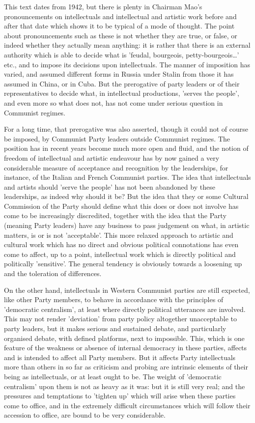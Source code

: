 This text dates from 1942, but there is plenty in Chairman Mao's pronouncements on intellectuals and intellectual and artistic work before and after that date which shows it to be typical of a mode of thought. The point about pronouncements such as these is not whether they are true, or false, or indeed whether they actually mean anything: it is rather that there is an external authority which is able to decide what is 'feudal, bourgeois, petty-bourgeois\dots{}' etc., and to impose its decisions upon intellectuals. The manner of imposition has varied, and assumed different forms in Russia under Stalin from those it has assumed in China, or in Cuba. But the prerogative of party leaders or of their representatives to decide what, in intellectual productions, 'serves the people', and even more so what does not, has not come under serious question in Communist regimes.

For a long time, that prerogative was also asserted, though it could not of course be imposed, by Communist Party leaders outside Communist regimes. The position has in recent years become much more open and fluid, and the notion of freedom of intellectual and artistic endeavour has by now gained a very considerable measure of acceptance and recognition by the leaderships, for instance, of the Italian and French Communist parties. The idea that intellectuals and artists should 'serve the people' has not been abandoned by these leaderships, as indeed why should it be? But the idea that they or some Cultural Commission of the Party should define what this does or does not involve has come to be increasingly discredited, together with the idea that the Party (meaning Party leaders) have any business to pass judgement on what, in artistic matters, is or is not 'acceptable'. This more relaxed approach to artistic and cultural work which has no direct and obvious political connotations has even come to affect, up to a point, intellectual work which is directly political and politically 'sensitive'. The general tendency is obviously towards a loosening up and the toleration of differences.

On the other hand, intellectuals in Western Communist parties are still expected, like other Party members, to behave in accordance with the principles of 'democratic centralism', at least where directly political utterances are involved. This may not render 'deviation' from party policy altogether unacceptable to party leaders, but it makes serious and sustained debate, and particularly organised debate, with defined platforms, next to impossible. This, which is one feature of the weakness or absence of internal democracy in these parties, affects and is intended to affect all Party members. But it affects Party intellectuals more than others in so far as criticism and probing are intrinsic elements of their being as intellectuals, or at least ought to be. The weight of 'democratic centralism' upon them is not as heavy as it was: but it is still very real; and the pressures and temptations to 'tighten up' which will arise when these parties come to office, and in the extremely difficult circumstances which will follow their accession to office, are bound to be very considerable.

